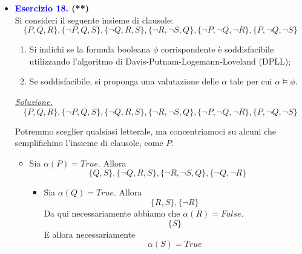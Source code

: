 \documentclass[a4paper,10pt]{article}
\begin{document}
{\begin{itemize}[label=, leftmargin=0pt]
\begin{osservazioni}
    \begin{itemize}[label=*]
        \item Sia $\alpha(A)=True$. Allora: 
        $$\{C\}, \{\neg C\}$$
        Si ottiene la clausola vuota: è necessario effettuare \textit{backtrack}.
        \item Sia $\alpha(A)=False$. Allora:
        $$\{B\}, \{\neg B\}$$\\
        Si ottiene la clausola vuota: è necessario effettuare \textit{backtrack}.
    \end{itemize}
    Non è possibile effettuare nuovamente backtrack e non si è ottenuta l'insieme vuoto di clausole: segue l'insoddisfacibilità della formula booleana corrispodente. Idealmente, nessuna assegnazione di $A$ è permette a $\phi$ di essere verificata.
    \end{osservazioni}

    \item \textbf{\textcolor{blue}{Esercizio 18.} (**)}\\ 	
    Si consideri il seguente insieme di clausole:
    $$\{P, Q, R\}, \{\lnot P, Q, S\}, \{\lnot Q, R, S\}, \{\lnot R, \lnot S, Q\}, \{\lnot P, \lnot Q, \lnot R\}, \{P, \lnot Q, \lnot S\}$$
    \begin{enumerate}
        \item Si indichi se la formula booleana $\phi$ corrispondente è soddisfacibile utilizzando l'algoritmo di Davis-Putnam-Logemann-Loveland (DPLL);
        \item Se soddisfacibile, si proponga una valutazione delle  $\alpha$ tale per cui $\alpha\models\phi$.
    \end{enumerate}

    \begin{osservazioni}
    \underline{\textit{Soluzione.}}\\
    
    $$\{P, Q, R\}, \{\lnot P, Q, S\}, \{\lnot Q, R, S\}, \{\lnot R, \lnot S, Q\}, \{\lnot P, \lnot Q, \lnot R\}, \{P, \lnot Q, \lnot S\}$$
    
    Potremmo sceglier qualsiasi letterale, ma concentriamoci su alcuni che semplifichino l'insieme di clausole, come $P$.
    \begin{itemize}[label=*]
        \item Sia $\alpha(P)=True$. Allora 
        $$\{Q, S\}, \{\lnot Q, R, S\}, \{\lnot R, \lnot S, Q\}, \{\lnot Q, \lnot R\}$$
        \begin{itemize}[label=*]
            \item Sia $\alpha(Q)=True$. Allora
            $$\{R, S\}, \{\lnot R\}$$
            Da qui necessariamente abbiamo che $\alpha(R)=False$. 
            $$\{S\}$$
            E allora necessariamente $$\alpha(S)=True$$
        \end{itemize}
    \end{itemize}


\end{osservazioni}
\end{itemize}}
\end{document}
